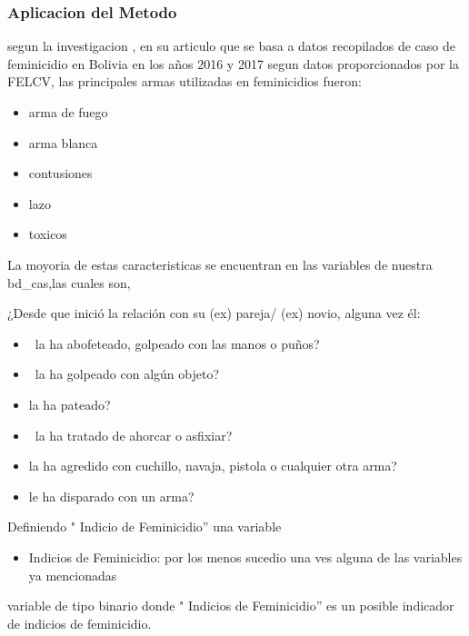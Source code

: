 \documentclass[11pt,letter]{article}
\begin{document}
\subsubsection{Aplicacion del Metodo }
segun la investigacion \autocite{cruz2019factores}, en su articulo que se basa a datos recopilados de caso de feminicidio en Bolivia en los años 2016 y 2017 segun datos proporcionados por la FELCV, las principales armas utilizadas en feminicidios fueron:
\begin{itemize}
    \item arma de fuego
\item arma blanca
\item contusiones
\item lazo 
\item toxicos 
\end{itemize}

La moyoria de estas caracteristicas se encuentran en las variables de nuestra bd_cas,las cuales son,

¿Desde que inició la relación con su (ex) pareja/ (ex) novio, alguna vez él:

\begin{itemize}
    \item  la ha abofeteado, golpeado con las manos o puños?

\item  la ha golpeado con algún objeto?

\item	 la ha pateado?
\item	 la ha tratado de ahorcar o asfixiar?

\item	la ha agredido con cuchillo, navaja, pistola o cualquier otra arma?

\item	le ha disparado con un arma?
 
\end{itemize}

Definiendo " Indicio de Feminicidio'' una variable
\begin{itemize}
    \item Indicios de Feminicidio: por los menos sucedio una ves alguna de las variables ya mencionadas

\end{itemize}
variable de tipo binario
donde " Indicios de Feminicidio'' es un posible indicador de indicios de feminicidio.
\end{document}
